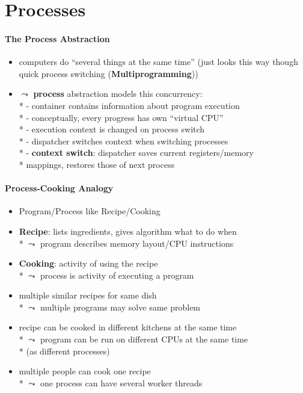 \section{Processes}

\paragraph{The Process Abstraction}
\begin{itemize}
	\item computers do "`several things at the same time"' (just looks this way though quick process switching (\textbf{Multiprogramming}))
	\item \( \leadsto \) \textbf{process} abstraction models this concurrency: \\*
		- container contains information about program execution \\*
		- conceptually, every progress has own "`virtual CPU"' \\*
		- execution context is changed on process switch \\*
		- dispatcher switches context when switching processes \\*
		- \textbf{context switch}: dispatcher saves current registers/memory \\* \phantom{-} mappings, restores those of next process
\end{itemize}

\paragraph{Process-Cooking Analogy}
\begin{itemize}
	\item Program/Process like Recipe/Cooking
	\item \textbf{Recipe}: lists ingredients, gives algorithm what to do when \\*
		\( \leadsto \) program describes memory layout/CPU instructions
	\item \textbf{Cooking}: activity of using the recipe \\*
		\( \leadsto \) process is activity of executing a program
	\item multiple similar recipes for same dish \\*
		\( \leadsto \) multiple programs may solve same problem
	\item recipe can be cooked in different kitchens at the same time \\*
		\( \leadsto \) program can be run on different CPUs at the same time \\* \phantom{\( \leadsto \)} (as different processes)
	\item multiple people can cook one recipe \\*
		\( \leadsto \) one process can have several worker threads
\end{itemize}

